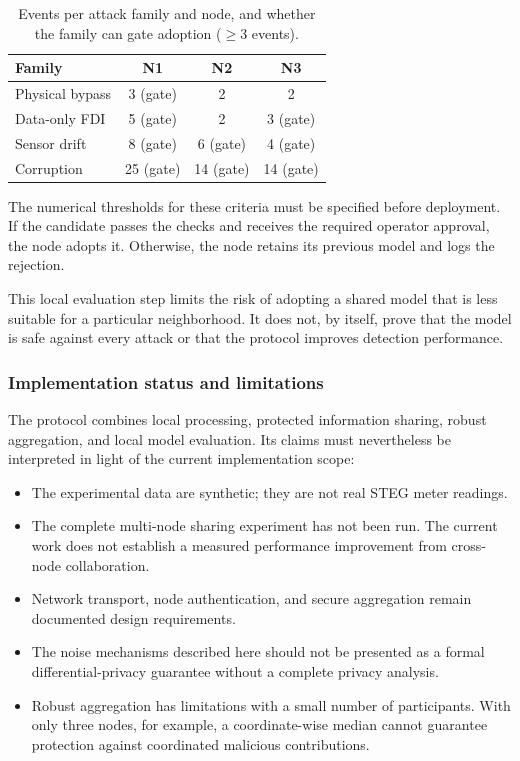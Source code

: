 \documentclass[11pt,a4paper]{article}
\newcommand{\hdr}{\rowcolor{emblue!15}}
\begin{document}
\begin{table}[H]
\centering\small
\caption{Events per attack family and node, and whether the family can gate adoption ($\ge3$ events).}
\label{tab:canary}
\begin{tabular}{@{}l ccc@{}}
\toprule\hdr
Family & N1 & N2 & N3 \\
\midrule
Physical bypass & 3 (gate) & 2 & 2 \\
Data-only FDI & 5 (gate) & 2 & 3 (gate) \\
Sensor drift & 8 (gate) & 6 (gate) & 4 (gate) \\
Corruption & 25 (gate) & 14 (gate) & 14 (gate) \\
\bottomrule
\end{tabular}
\end{table}

The numerical thresholds for these criteria must be specified before
deployment. If the candidate passes the checks and receives the
required operator approval, the node adopts it. Otherwise, the node
retains its previous model and logs the rejection.

This local evaluation step limits the risk of adopting a shared model
that is less suitable for a particular neighborhood. It does not,
by itself, prove that the model is safe against every attack or that
the protocol improves detection performance.

\subsubsection{Implementation status and limitations}

The protocol combines local processing, protected information
sharing, robust aggregation, and local model evaluation. Its claims
must nevertheless be interpreted in light of the current
implementation scope:
\begin{itemize}
    \item The experimental data are synthetic; they are not real
    STEG meter readings.
    \item The complete multi-node sharing experiment has not been run.
    The current work does not establish a measured performance
    improvement from cross-node collaboration.
    \item Network transport, node authentication, and secure
    aggregation remain documented design requirements.
    \item The noise mechanisms described here should not be presented
    as a formal differential-privacy guarantee without a complete
    privacy analysis.
    \item Robust aggregation has limitations with a small number of
    participants. With only three nodes, for example, a coordinate-wise
    median cannot guarantee protection against coordinated malicious
    contributions.
\end{itemize}
\end{document}
